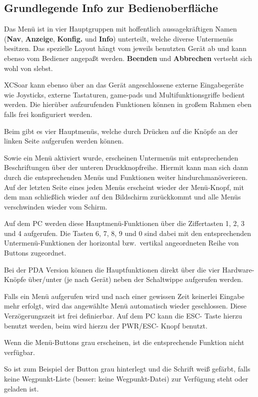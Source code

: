\subsection*{Grundlegende Info zur Bedienoberfläche}
Das Menü ist in vier Hauptgruppen mit hoffentlich aussagekräftigen Namen (\textbf{Nav}, \textbf{Anzeige}, \textbf{Konfig.} und \textbf{Info}) unterteilt, welche diverse Untermenüs besitzen. Das spezielle Layout hängt vom jeweils benutzten Gerät ab und kann ebenso vom Bediener angepaßt werden. \textbf{Beenden} und \textbf{Abbrechen} vertseht sich wohl von slebst. 

 \textsf{XCSoar} kann ebenso über an das Gerät angeschlossene externe Eingabegeräte wie Joysticks, externe Tastaturen, game-pads und Multifunktionsgriffe bedient werden. Die hierüber aufzurufenden Funktionen können in großem Rahmen eben falls frei konfiguriert  werden.


Beim  \al  gibt es vier Hauptmenüs, welche durch Drücken auf die Knöpfe an der linken Seite aufgerufen werden können. 

Sowie ein Menü aktiviert wurde, erscheinen Untermenüs mit entsprechenden Beschriftungen über der unteren Druckknopfreihe. 
Hiermit kann man sich dann durch die entsprechenden Menüs und Funktionen weiter hindurchmanöverieren. 
Auf der letzten Seite eines jeden Menüs erscheint wieder der Menü-Knopf, mit dem man schließlich wieder auf den 
Bildschirm zurückkommt und alle Menüs verschwinden wieder vom Schirm. 
 


Auf dem \textsf{PC} werden diese Hauptmenü-Funktionen über die Ziffertasten 1, 2, 3 und  4 aufgerufen. Die Tasten 6, 7, 8, 9 und  0 sind dabei mit den
entsprechenden Untermenü-Funktionen der horizontal bzw.\ vertikal angeordneten Reihe von Buttons  zugeordnet.

Bei der PDA Version können die Hauptfunktionen direkt über die vier Hardware-Knöpfe über/unter (je nach Gerät) neben der Schaltwippe aufgerufen werden.

Falls ein Menü aufgerufen wird und nach einer gewissen Zeit keinerlei Eingabe mehr erfolgt, wird das angewählte Menü automatisch wieder geschlossen.  Diese Verzögerungszeit ist frei definierbar.  Auf dem \textsf{PC} kann die ESC- Taste hierzu benutzt werden, beim  \al wird hierzu der PWR/ESC- Knopf benutzt.

Wenn die Menü-Buttons grau erscheinen, ist die entsprechende Funktion nicht verfügbar.

So ist zum Beispiel der Button \textcolor{white}{} grau hinterlegt und die Schrift weiß gefärbt, falls keine Wegpunkt-Liste (besser: keine Wegpunkt-Datei) zur Verfügung steht oder geladen ist.

